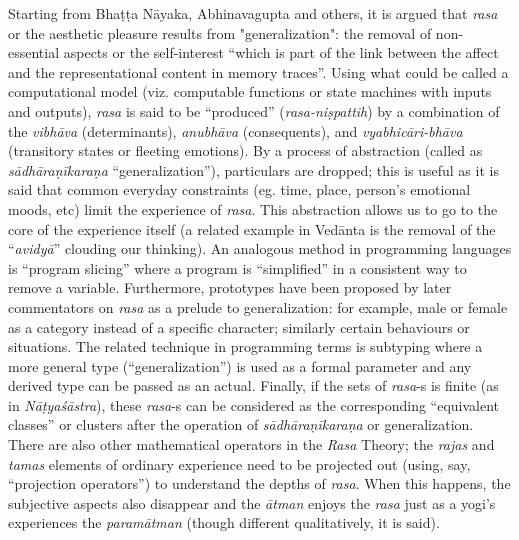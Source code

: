 Starting from Bhaṭṭa Nāyaka, Abhinavagupta and others, it is argued that \textsl{rasa} or the aesthetic pleasure results from "generalization": the removal of non-essential aspects or the self-interest “which is part of the link between the affect and the representational content in memory traces”. Using what could be called a computational model (viz. computable functions or state machines with inputs and outputs), \textsl{rasa} is said to be “produced” (\textsl{rasa-niṣpattih}) by a combination of the \textsl{vibhāva} (determinants), \textsl{anubhāva} (consequents), and \textsl{vyabhicāri-bhāva} (transitory states or fleeting emotions). By a process of abstraction (called as \textsl{sādhāraṇīkaraṇa} “generalization”), particulars are dropped; this is useful as it is said that common everyday constraints (eg. time, place, person’s emotional moods, etc) limit the experience of \textsl{rasa}. This abstraction allows us to go to the core of the experience itself (a related example in Vedānta is the removal of the “\textsl{avidyā}” clouding our thinking). An analogous method in programming languages is “program slicing” where a program is “simplified” in a consistent way to remove a variable. Furthermore, prototypes have been proposed by later commentators on \textsl{rasa} as a prelude to generalization: for example, male or female as a category instead of a specific character; similarly certain behaviours or situations. The related technique in programming terms is subtyping where a more general type (“generalization”) is used as a formal parameter and any derived type can be passed as an actual. Finally, if the sets of \textsl{rasa}-s is finite (as in \textsl{Nāṭyaśāstra}), these \textsl{rasa}-s can be considered as the corresponding “equivalent classes” or clusters after the operation of \textsl{sādhāraṇīkaraṇa} or generalization. There are also other mathematical operators in the \textsl{Rasa} Theory; the \textsl{rajas} and \textsl{tamas} elements of ordinary experience need to be projected out (using, say, “projection operators”) to understand the depths of \textsl{rasa}. When this happens, the subjective aspects also disappear and the \textsl{ātman} enjoys the \textsl{rasa} just as a yogi’s experiences the \textsl{paramātman} (though different qualitatively, it is said).

